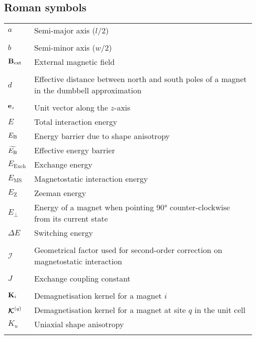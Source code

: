 \subsection*{Roman symbols}
\begin{longtable}[l]{p{60pt} p{350pt}}
	$a$ & Semi-major axis ($l/2$) \\
	&\\

	$b$ & Semi-minor axis ($w/2$) \\
	$\boldsymbol{\mathbf{B}}_\mathrm{ext}$ & External magnetic field \\
	&\\

	$d$ & Effective distance between north and south poles of a magnet in the dumbbell approximation \\
	&\\

	$\boldsymbol{\mathbf{e}}_z$ & Unit vector along the $z$-axis \\
	$E$ & Total interaction energy \\
	$E_\mathrm{B}$ & Energy barrier due to shape anisotropy \\ %
	$\widetilde{E_\mathrm{B}}$ & Effective energy barrier \\
	$E_\mathrm{Exch}$ & Exchange energy\\
	$E_\mathrm{MS}$ & Magnetostatic interaction energy \\
	$E_\mathrm{Z}$ & Zeeman energy\\
	$E_\perp$ & Energy of a magnet when pointing \ang{90} counter-clockwise from its current state \\
	$\Delta E$ & Switching energy \\
	&\\

	$\mathcal{I}$ & Geometrical factor used for second-order correction on magnetostatic interaction \\
	&\\

	$J$ & Exchange coupling constant \\
	&\\

	$\boldsymbol{\mathbf{K}}_i$ & Demagnetisation kernel for a magnet $i$ \\
	$\boldsymbol{\mathbf{\mathcal{K}}}^{(q)}$ & Demagnetisation kernel for a magnet at site $q$ in the unit cell \\
	$K_u$ & Uniaxial shape anisotropy \\
	&\\


\end{longtable}
